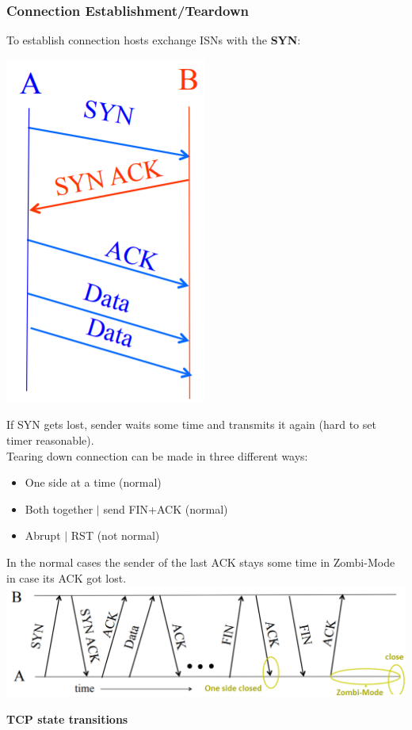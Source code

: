 \documentclass[a4paper, fontsize=8pt, landscape, DIV=1]{scrartcl}
\begin{document}
\begin{multicols*}{4}
		\subsubsection{Connection Establishment/Teardown}
		To establish connection hosts exchange ISNs with the \textbf{SYN}:\\
		\begin{center}
			\includegraphics[height=0.5\columnwidth]{images/Transport_Layer/SYN.png}
		\end{center}
		If SYN gets lost, sender waits some time and transmits it again (hard to set
		timer reasonable).\\
		Tearing down connection can be made in three different ways: 
		\begin{itemize}[noitemsep]
			\item One side at a time (normal)
			\item Both together $\vert$ send FIN+ACK (normal)
			\item Abrupt $\vert$ RST (not normal)
		\end{itemize} 
		In the normal cases the sender of the last ACK stays some time in Zombi-Mode
		in case its ACK got lost. 
		\includegraphics[width=\columnwidth]{images/Transport_Layer/TCP_FIN.png}
		\par 
		
		\textbf{TCP state transitions}\\
		

\end{multicols*}
\end{document}
